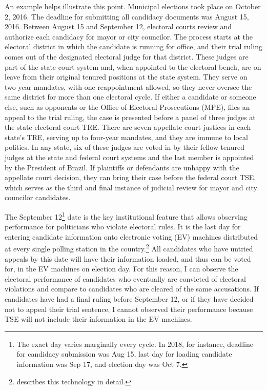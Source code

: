 \documentclass[11pt]{article}
\begin{document}
An example helps illustrate this point. Municipal elections took place on October 2, 2016. The deadline for submitting all candidacy documents was August 15, 2016. Between August 15 and September 12, electoral courts review and authorize each candidacy for mayor or city councilor. The process starts at the electoral district in which the candidate is running for office, and their trial ruling comes out of the designated electoral judge for that district. These judges are part of the state court system and, when appointed to the electoral bench, are on leave from their original tenured positions at the state system. They serve on two-year mandates, with one reappointment allowed, so they never oversee the same district for more than one electoral cycle. If either a candidate or someone else, such as opponents or the Office of Electoral Prosecutions (MPE), files an appeal to the trial ruling, the case is presented before a panel of three judges at the state electoral court TRE. There are seven appellate court justices in each state's TRE, serving up to four-year mandates, and they are immune to local politics. In any state, six of these judges are voted in by their fellow tenured judges at the state and federal court systems and the last member is appointed by the President of Brazil. If plaintiffs or defendants are unhappy with the appellate court decision, they can bring their case before the federal court TSE, which serves as the third and final instance of judicial review for mayor and city councilor candidates.

The September 12\footnote{The exact day varies marginally every cycle. In 2018, for instance, deadline for candidacy submission was Aug 15, last day for loading candidate information was Sep 17, and election day was Oct 7.} date is the key institutional feature that allows observing performance for politicians who violate electoral rules. It is the last day for entering candidate information onto electronic voting (EV) machines distributed at every single polling station in the country.\footnote{\citet{FujiwaraVotingTechnologyPolitical2015} describes this technology in detail.} All candidates who have untried appeals by this date will have their information loaded, and thus can be voted for, in the EV machines on election day. For this reason, I can observe the electoral performance of candidates who eventually are convicted of electoral violations and compare to candidates who are cleared of the same accusations. If candidates have had a final ruling before September 12, or if they have decided not to appeal their trial sentence, I cannot observed their performance because TSE will not include their information in the EV machines.
\end{document}
